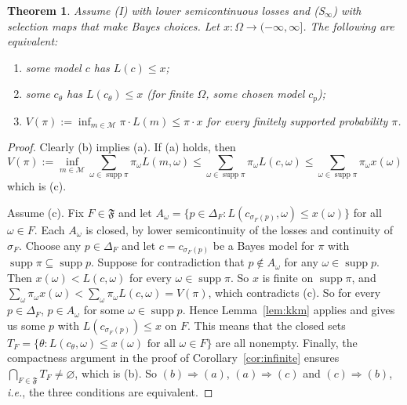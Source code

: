 \documentclass[11pt]{article}
\newtheorem{theorem}{Theorem}[section]
\theoremstyle{definition}
\theoremstyle{remark}
\newcommand{\M}{\mathcal M}
\newcommand{\F}{\mathfrak F}
\newcommand{\supp}{\operatorname{supp}}
\begin{document}
\begin{theorem}\label{thm:margin}
Assume (I) with lower semicontinuous losses and (S$_\infty$) with selection maps that make Bayes choices. Let $x:\Omega\to(-\infty,\infty]$. The following are equivalent:
\begin{enumerate}[label=(\alph*)]
\item some model $c$ has $L(c)\le x$;
\item some $c_\theta$ has $L(c_\theta)\le x$ (for finite $\Omega$, some chosen model $c_p$);
\item $V(\pi):=\inf_{m\in\M}\pi\cdot L(m)\le\pi\cdot x$ for every finitely supported probability $\pi$.
\end{enumerate}
\end{theorem}
\begin{proof}
Clearly (b) implies (a). If (a) holds, then
\[
V(\pi):=\inf_{m\in\M}\sum_{\omega\in\supp\pi}\pi_\omega L(m,\omega)\le\sum_{\omega\in\supp\pi}\pi_\omega L(c,\omega)\le\sum_{\omega\in\supp\pi}\pi_\omega x(\omega)
\]
which is (c).

Assume (c). Fix $F\in\F$ and let $A_\omega=\{p\in\Delta_F:L(c_{\sigma_F(p)},\omega)\le x(\omega)\}$ for all $\omega\in F$. Each $A_\omega$ is closed, by lower semicontinuity of the losses and continuity of $\sigma_F$. Choose any $p\in\Delta_F$ and let $c=c_{\sigma_F(p)}$ be a Bayes model for $\pi$ with $\supp\pi\subseteq\supp p$. Suppose for contradiction that $p\not\in A_\omega$ for any $\omega\in\supp p$. Then $x(\omega)<L(c,\omega)$ for every $\omega\in\supp\pi$. So $x$ is finite on $\supp\pi$, and $\sum_\omega\pi_\omega x(\omega)<\sum_\omega\pi_\omega L(c,\omega)=V(\pi)$, which contradicts (c). So for every $p\in\Delta_F$, $p\in A_\omega$ for some $\omega\in\supp p$. Hence Lemma~\ref{lem:kkm} applies and gives us some $p$ with $L(c_{\sigma_F(p)})\le x$ on $F$. This means that the closed sets $T_F=\{\theta:L(c_\theta,\omega)\le x(\omega)\text{ for all }\omega\in F\}$ are all nonempty. Finally, the compactness argument in the proof of Corollary~\ref{cor:infinite} ensures $\bigcap_{F\in\F}T_F\neq \varnothing$, which is (b). So $(b)\Rightarrow (a)$, $(a)\Rightarrow (c)$ and $(c)\Rightarrow (b)$, \textit{i.e.}, the three conditions are equivalent.
\end{proof}


\end{document}
